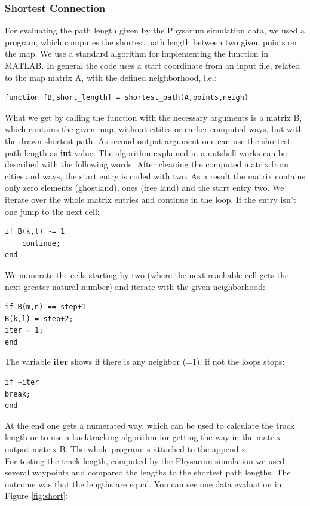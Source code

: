 \documentclass[11pt]{scrartcl}
\begin{document}
\subsubsection{Shortest Connection}
For evaluating the path length given by the Physarum simulation data, we used a program, which computes the shortest path length between two given points on the map. We use a standard algorithm \cite{gaertner2010} for implementing the function in MATLAB. In general the code uses a start coordinate from an input file, related to the map matrix A, with the defined neighborhood, i.e.:
\begin{verbatim}
function [B,short_length] = shortest_path(A,points,neigh)
\end{verbatim}
What we get by calling the function with the necessary arguments is a matrix B, which contains the given map, without citites or earlier computed ways, but with the drawn shortest path. As second output argument one can use the shortest path length as \textbf{int} value. The algorithm explained in a nutshell works can be described with the following words: After cleaning the computed matrix from cities and ways, the start entry is coded with two. As a result the matrix contains only zero elements (ghostland), ones (free land) and the start entry two. We iterate over the whole matrix entries and continue in the loop. If the entry isn't one jump to the next cell:
\begin{verbatim}
if B(k,l) ~= 1
	continue;
end
\end{verbatim}
We numerate the cells starting by two (where the next reachable cell gets the next greater natural number) and iterate with the given neighborhood:
\begin{verbatim}
if B(m,n) == step+1
B(k,l) = step+2;
iter = 1;
end
\end{verbatim}
The variable \textbf{iter} shows if there is any neighbor (=1), if not the loops stops:
\begin{verbatim}
if ~iter
break;
end
\end{verbatim}
At the end one gets a numerated way, which can be used to calculate the track length or to use a backtracking algorithm for getting the way in the matrix output matrix B. The whole program is attached to the appendix.\\
For testing the track length, computed by the Physarum simulation we used several waypoints and compared the lengths to the shortest path lengths. The outcome was that the lengths are equal. You can see one data evaluation in Figure \ref{fig:short}:
\end{document}
